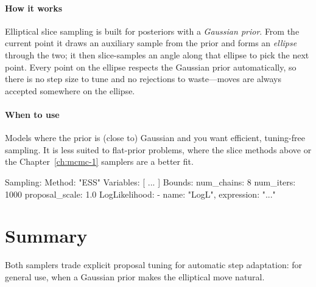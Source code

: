 \paragraph{How it works} Elliptical slice sampling is built for posteriors with a \emph{Gaussian
prior}. From the current point it draws an auxiliary sample from the prior and forms an
\emph{ellipse} through the two; it then slice-samples an angle along that ellipse to pick the next
point. Every point on the ellipse respects the Gaussian prior automatically, so there is no step
size to tune and no rejections to waste---moves are always accepted somewhere on the ellipse.

\paragraph{When to use} Models where the prior is (close to) Gaussian and you want efficient,
tuning-free sampling. It is less suited to flat-prior problems, where the slice methods above or
the Chapter~\ref{ch:mcmc-1} samplers are a better fit.

\begin{yamlwin}
Sampling:
  Method: "ESS"
  Variables: [ ... ]
  Bounds:
    num_chains: 8
    num_iters: 1000
    proposal_scale: 1.0
  LogLikelihood:
    - {name: "LogL", expression: "..."}
\end{yamlwin}

\section{Summary}
\label{sec:mcmc3-summary}

Both samplers trade explicit proposal tuning for automatic step adaptation:  for
general use,  when a Gaussian prior makes the elliptical move natural.
